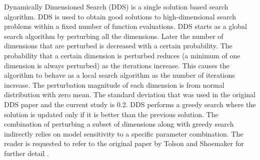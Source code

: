 \documentclass{bmcart}
\begin{document}
Dynamically Dimensioned Search (DDS) is a single solution based search algorithm. DDS is used to obtain good solutions to high-dimensional search problems within a fixed number of function evaluations. DDS starts as a global search algorithm by perturbing all the dimensions. Later the number of dimensions that are perturbed is decreased with a certain probability. The probability that a certain dimension is perturbed reduces (a minimum of one dimension is always perturbed) as the iterations increase. This causes the algorithm to behave as a local search algorithm as the number of iterations increase. The perturbation magnitude of each dimension is from normal distribution with zero mean. The standard deviation that was used in the original DDS paper and the current study is 0.2.
DDS performs a greedy search where the solution is updated only if it is better than the previous solution. The combination of perturbing a subset of dimensions along with greedy search indirectly relies on model sensitivity to a specific parameter combination. The reader is requested to refer to the original paper by Tolson and Shoemaker for further detail \cite{tolson2007dynamically}.
\end{document}
